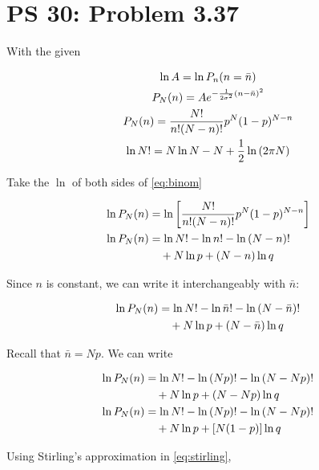 \documentclass[12pt,a4paper,twocolumn]{article}
\begin{document}
\setcounter{page}{1}

\section*{PS 30: Problem 3.37}
\bigskip

With the given

\begin{gather}
	\ln A = \ln P_n(n = \bar{n}) \label{givenln} \\
	P_N(n) = Ae^{-\frac{1}{2\sigma^2}(n - \bar{n})^2} \label{eq:givenfunc} \\
	P_N(n) = \frac{N!}{n!(N-n)!}p^N(1-p)^{N-n} \label{eq:binom} \\
	\ln N! = N\ln N - N + \frac{1}{2}\ln\qty(2\pi N) \label{eq:stirling}
\end{gather}

Take the $\ln$ of both sides of \eqref{eq:binom}

\begin{align}
	\ln P_N(n) &= \ln\qty[\frac{N!}{n!(N-n)!}p^N(1-p)^{N-n}] \nonumber \\
	\ln P_N(n) &= \ln N! - \ln n! - \ln\qty(N-n)! \nonumber \\
	& \quad + N\ln p + (N-n)\ln q
\end{align}

Since $n$ is constant, we can write it interchangeably with $\bar{n}$:

\begin{align}
	\ln P_N(n) &= \ln N! - \ln \bar{n}! - \ln\qty(N-\bar{n})! \nonumber \\
	& \quad + N\ln p + (N-\bar{n})\ln q
\end{align}

Recall that $\bar{n} = Np$. We can write

\begin{align}
	\ln P_N(n) &= \ln N! - \ln\qty(Np)! - \ln\qty(N - Np)! \nonumber \\
	& \quad + N \ln p + (N - Np)\ln q \nonumber \\
	\ln P_N(n) &= \ln N! - \ln\qty(Np)! - \ln\qty(N - Np)! \nonumber \\
	& \quad + N \ln p + [N(1-p)]\ln q
\end{align}

Using Stirling's approximation in \eqref{eq:stirling},
\end{document}
